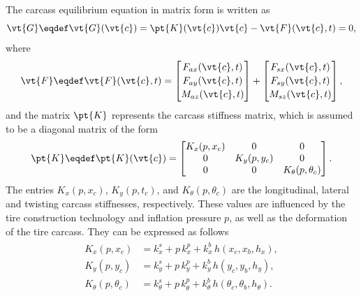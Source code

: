 The carcass equilibrium equation in matrix form is written as
%
\begin{equation}
  \vt{G} \eqdef \vt{G}(\vt{c}) = \pt{K}(\vt{c}) \vt{c} - \vt{F}(\vt{c},t) = 0,
  \label{app3:eq:nls}
\end{equation}
%
where
%
\begin{equation}
  \vt{F} \eqdef \vt{F}(\vt{c},t) =
  \begin{bmatrix}
    F_{ax}(\vt{c},t) \\[0.2em]
    F_{ay}(\vt{c},t) \\[0.2em]
    M_{az}(\vt{c},t)
  \end{bmatrix} + \begin{bmatrix}
    F_{sx}(\vt{c},t) \\[0.2em]
    F_{sy}(\vt{c},t) \\[0.2em]
    M_{sz}(\vt{c},t)
  \end{bmatrix},
\end{equation}
%
and the matrix $\pt{K}$ represents the carcass stiffness matrix, which is assumed to be a diagonal matrix of the form
%
\begin{equation}
  \pt{K} \eqdef \pt{K}(\vt{c}) =
  \begin{bmatrix}
    K_x(p,x_c) & 0 & 0 \\
    0 & K_y(p,y_c) & 0 \\
    0 & 0 & K_\theta(p,\theta_c)
  \end{bmatrix}.
\end{equation}
%
The entries $K_x(p,x_c)$, $K_y(p,t_c)$, and $K_\theta(p,\theta_c)$ are the longitudinal, lateral and twisting carcass stiffnesses, respectively. These values are influenced by the tire construction technology and inflation pressure $p$, as well as the deformation of the tire carcass. They can be expressed as follows
%
\begin{equation}
  \begin{split}
    \begin{aligned}
      K_x(p,x_c)           &= k_x^s      + p \, k_x^p      + k_x^b \, h(x_c, x_b, h_x), \\
      K_y(p,y_c)           &= k_y^s      + p \, k_y^p      + k_y^b \, h(y_c, y_b, h_y), \\
      K_\theta(p,\theta_c) &= k_\theta^s + p \, k_\theta^p + k_\theta^b \, h(\theta_c, \theta_b, h_\theta). \\
    \end{aligned}
  \end{split}
\end{equation}

